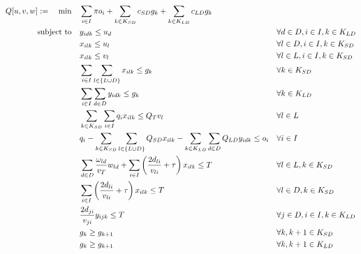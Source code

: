 \documentclass[preprint,review,11pt,authoryear]{elsarticle}
\begin{document}
\begin{subequations} \label{formulation:2ndStage}
    \begin{align}
        Q[u,v,w] :=  \quad \min \quad & \sum_{i \in I} \pi o_i + \sum_{k \in K_{SD}} c_{SD} g_k + \sum_{k \in K_{LD}} c_{LD} g_k & & \label{objective:2ndStageObj} \\
                     \subjectto \quad & y_{idk} \leq u_d && \forall d \in D, i \in I, k \in K_{LD} \label{constraint:DepotOpen1}\\
                                      & x_{ilk} \leq u_l && \forall l \in D, i \in I, k \in K_{SD} \label{constraint:DepotOpen2}\\
                                      & x_{ilk} \leq v_l && \forall l \in L, i \in I, k \in K_{SD} \label{constraint:LaunchPointOpen} \\
                                      & \sum_{i \in I} \sum_{l \in \{L \cup D\}}x_{ilk} \leq g_k && \forall k \in K_{SD} \label{constraint:SmallDrone_Usage}\\
                                      & \sum_{i \in I} \sum_{d \in D}y_{idk} \leq g_k && \forall k \in K_{LD} \label{constraint:LargeDrone_Usage}\\
                                      & \sum_{k \in K_{SD}} \sum_{i \in I} q_i x_{ilk} \leq Q_T v_l && \forall l \in L \label{constraint:TrucksCapacity} \\
                                      & q_i - \sum_{k \in K_{SD}}\sum_{l \in \{L \cup D\}} Q_{SD} x_{ilk} - \sum_{k \in K_{LD}}\sum_{d \in D} Q_{LD} y_{idk} \leq o_i && \forall i \in I \label{constraint:UnmetDemand} \\
                                      & \sum_{d \in D} \frac{\omega_{ld}}{v_T} w_{ld} + \sum_{i \in I} \left( \frac{2d_{li}}{v_{li}} + \tau \right) x_{ilk} \leq T && \forall l \in L, k \in K_{SD} \label{constraint:LPTimeLimitSD} \\
                                      & \sum_{i \in I} \left( \frac{2d_{li}}{v_{li}} + \tau \right) x_{ilk} \leq T && \forall l \in D, k \in K_{SD} \label{constraint:DepotTimeLimitSD} \\
                                      & \frac{2d_{ji}}{v_{ji}} y_{ijk} \leq T && \forall j \in D, i \in I, k \in K_{LD} \label{constraint:DepotTimeLimitLD} \\
                                      & g_k \geq g_{k+1} && \forall k, k+1 \in K_{SD} \label{constraint:SD_Remove_Symmetry} \\
                                      & g_k \geq g_{k+1} && \forall k, k+1 \in K_{LD} \label{constraint:LD_Remove_Symmetry} \\

\end{align}
\end{subequations}
\end{document}
